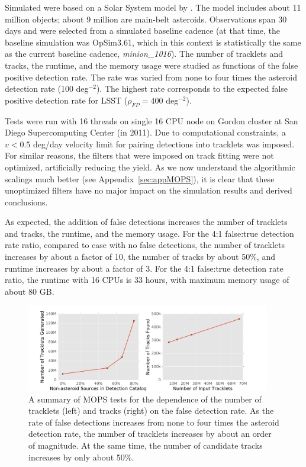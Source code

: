 Simulated \DIASources were based on a Solar System model by \citet{Grav2011}.
The model includes about 11 million objects; about 9 million are main-belt asteroids. Observations span
30 days and were selected from a simulated baseline cadence (at that time, the baseline simulation was
OpSim3.61, which in this context is statistically the same as the current baseline cadence, {\it minion\_1016}).
The number of tracklets and tracks, the runtime, and the memory usage were studied as functions of
the false positive detection rate. The rate was varied from none to four times the asteroid detection rate
(100 deg$^{-2}$).  The highest rate corresponds to the expected false positive detection rate for LSST
($\rho_{FP} =  400$ deg$^{-2}$).

Tests were run with 16 threads on single 16 CPU node on Gordon cluster at San Diego Supercomputing
Center (in 2011). Due to computational constraints, a $v < 0.5$ deg/day velocity limit for pairing detections
into tracklets was imposed. For similar reasons, the filters that were imposed on track fitting were not
optimized, artificially reducing the yield. As we now understand the algorithmic scalings much better
(see Appendix~\ref{sec:appMOPS}), it is clear that these unoptimized filters have no major impact on the
simulation results and derived conclusions.

As expected, the addition of false detections increases the number of tracklets and tracks,
the runtime, and the memory usage. For the 4:1 false:true detection rate ratio, compared to case with
no false detections, the number of tracklets increases by about
a factor of 10, the number of tracks by about 50\%, and runtime increases by about a factor of 3.
For the 4:1 false:true detection rate ratio, the runtime with 16 CPUs is 33 hours, with maximum memory
usage of about 80 GB.




\begin{figure}[t!]
\centering
\vskip -0.3in
\includegraphics[width=0.95\textwidth]{figures/track_stats}
\caption{A summary of MOPS tests for the dependence of the number of tracklets (left)
and tracks (right) on the false detection rate. As the rate of false detections
increases from none to four times the asteroid detection rate, the number of tracklets
increases by about an order of magnitude. At the same time, the number of candidate
tracks increases by only about 50\%.
\label{fig:MOPStests}}
\end{figure}




